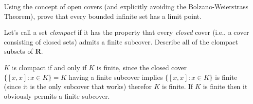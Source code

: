 \begin{exercise}
  Using the concept of open covers (and explicitly avoiding the Bolzano-Weierstrass Theorem), prove that every bounded infinite set has a limit point.
\end{exercise}

\begin{solution}
  \TODO
\end{solution}

\begin{exercise}
  Let's call a set \emph{clompact} if it has the property that every \emph{closed} cover (i.e., a cover consisting of closed sets) admits a finite subcover. Describe all of the clompact subsets of $\mathbf{R}$.
\end{exercise}

\begin{solution}
  $K$ is clompact if and only if $K$ is finite, since the closed cover $\{[x,x] : x \in K\} = K$ having a finite subcover implies $\{[x,x] : x \in K\}$ is finite (since it is the only subcover that works) therefor $K$ is finite. If $K$ is finite then it obviously permits a finite subcover.
\end{solution}

